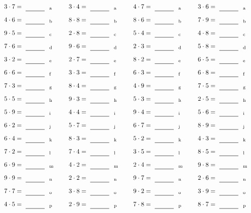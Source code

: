 \documentclass
[
  draft    = true,
  fontsize = 11pt,
  parskip  = half-
]
{scrartcl}
\begin{document}
\par\vfill\par
\begin{align*}
    \pline{3\cdot7}&=\rline{a}
  & \pline{3\cdot4}&=\rline{a}
  & \pline{4\cdot7}&=\rline{a}
  & \pline{3\cdot6}&=\rline{a} \\[1ex]
    \pline{4\cdot6}&=\rline{b}
  & \pline{8\cdot8}&=\rline{b}
  & \pline{8\cdot6}&=\rline{b}
  & \pline{7\cdot9}&=\rline{b} \\[1ex]
    \pline{9\cdot5}&=\rline{c}
  & \pline{2\cdot8}&=\rline{c}
  & \pline{5\cdot4}&=\rline{c}
  & \pline{4\cdot8}&=\rline{c} \\[1ex]
    \pline{7\cdot6}&=\rline{d}
  & \pline{9\cdot6}&=\rline{d}
  & \pline{2\cdot3}&=\rline{d}
  & \pline{5\cdot8}&=\rline{d} \\[1ex]
    \pline{3\cdot2}&=\rline{e}
  & \pline{2\cdot7}&=\rline{e}
  & \pline{8\cdot2}&=\rline{e}
  & \pline{6\cdot5}&=\rline{e} \\[1ex]
    \pline{6\cdot6}&=\rline{f}
  & \pline{3\cdot3}&=\rline{f}
  & \pline{6\cdot3}&=\rline{f}
  & \pline{6\cdot8}&=\rline{f} \\[1ex]
    \pline{7\cdot3}&=\rline{g}
  & \pline{8\cdot4}&=\rline{g}
  & \pline{4\cdot9}&=\rline{g}
  & \pline{7\cdot5}&=\rline{g} \\[1ex]
    \pline{5\cdot5}&=\rline{h}
  & \pline{9\cdot3}&=\rline{h}
  & \pline{5\cdot3}&=\rline{h}
  & \pline{2\cdot5}&=\rline{h} \\[1ex]
    \pline{5\cdot9}&=\rline{i}
  & \pline{4\cdot4}&=\rline{i}
  & \pline{9\cdot4}&=\rline{i}
  & \pline{5\cdot6}&=\rline{i} \\[1ex]
    \pline{6\cdot2}&=\rline{j}
  & \pline{5\cdot7}&=\rline{j}
  & \pline{6\cdot7}&=\rline{j}
  & \pline{8\cdot9}&=\rline{j} \\[1ex]
    \pline{6\cdot4}&=\rline{k}
  & \pline{8\cdot3}&=\rline{k}
  & \pline{5\cdot2}&=\rline{k}
  & \pline{4\cdot3}&=\rline{k} \\[1ex]
    \pline{7\cdot2}&=\rline{l}
  & \pline{7\cdot4}&=\rline{l}
  & \pline{3\cdot5}&=\rline{l}
  & \pline{8\cdot5}&=\rline{l} \\[1ex]
    \pline{6\cdot9}&=\rline{m}
  & \pline{4\cdot2}&=\rline{m}
  & \pline{2\cdot4}&=\rline{m}
  & \pline{9\cdot8}&=\rline{m} \\[1ex]
    \pline{9\cdot9}&=\rline{n}
  & \pline{2\cdot2}&=\rline{n}
  & \pline{9\cdot7}&=\rline{n}
  & \pline{2\cdot6}&=\rline{n} \\[1ex]
    \pline{7\cdot7}&=\rline{o}
  & \pline{3\cdot8}&=\rline{o}
  & \pline{9\cdot2}&=\rline{o}
  & \pline{3\cdot9}&=\rline{o} \\[1ex]
    \pline{4\cdot5}&=\rline{p}
  & \pline{2\cdot9}&=\rline{p}
  & \pline{7\cdot8}&=\rline{p}
  & \pline{8\cdot7}&=\rline{p}
\end{align*}
\end{document}

